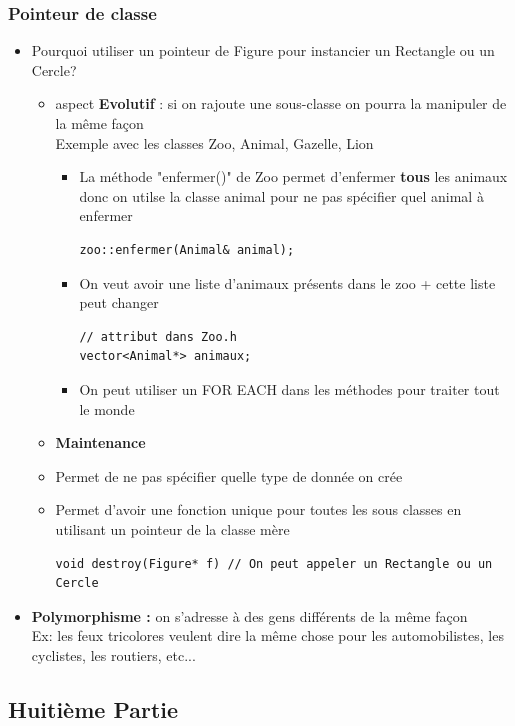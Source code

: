 \documentclass[12pt,a4paper]{article}
\begin{document}
\subsubsection{Pointeur de classe}
\begin{itemize}
\item Pourquoi utiliser un pointeur de Figure pour instancier un Rectangle ou un Cercle?
\begin{itemize}
\item aspect \textbf{Evolutif} : si on rajoute une sous-classe on pourra la manipuler de la même façon \\
Exemple avec les classes Zoo, Animal, Gazelle, Lion
\begin{itemize}
\item La méthode "enfermer()" de Zoo permet d'enfermer \textbf{tous} les animaux donc on utilse la classe animal pour ne pas spécifier quel animal à enfermer
\begin{lstlisting}
zoo::enfermer(Animal& animal);
\end{lstlisting}
\item On veut avoir une liste d'animaux présents dans le zoo + cette liste peut changer
\begin{lstlisting}
// attribut dans Zoo.h
vector<Animal*> animaux;
\end{lstlisting}
\item On peut utiliser un FOR EACH dans les méthodes pour traiter tout le monde
\end{itemize}
\item \textbf{Maintenance}
\item Permet de ne pas spécifier quelle type de donnée on crée
\item Permet d'avoir une fonction unique pour toutes les sous classes en utilisant un pointeur de la classe mère
\begin{lstlisting}
void destroy(Figure* f) // On peut appeler un Rectangle ou un Cercle
\end{lstlisting}
\end{itemize}
\item \textbf{Polymorphisme :} on s'adresse à des gens différents de la même façon\\
Ex: les feux tricolores veulent dire la même chose pour les automobilistes, les cyclistes, les routiers, etc...
\end{itemize}

\subsection{Huitième Partie}
\end{document}
